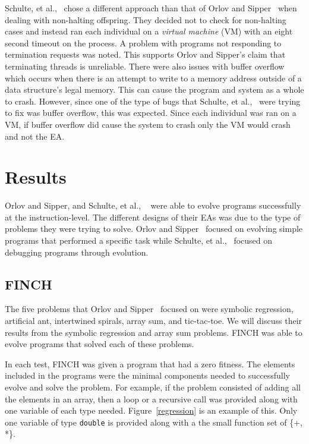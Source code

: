 \documentclass{sig-alternate}
\begin{document}
Schulte, et al.,~\cite{Assembly:2010} chose a different approach than that of Orlov and Sipper~\cite{FINCH:2011} when dealing with non-halting offspring. They decided not to check for non-halting cases and instead ran each individual on a \textit{virtual machine} (VM) with an eight second timeout on the process. A problem with programs not responding to termination requests was noted. This supports Orlov and Sipper's claim that terminating threads is unreliable. There were also issues with buffer overflow which occurs when there is an attempt to write to a memory address outside of a data structure's legal memory. This can cause the program and system as a whole to crash. However, since one of the type of bugs that Schulte, et al.,~\cite{Assembly:2010} were trying to fix was buffer overflow, this was expected. Since each individual was ran on a VM, if buffer overflow did cause the system to crash only the VM would crash and not the EA.




\section{Results}
Orlov and Sipper, and Schulte, et al., ~\cite{FINCH:2011, Assembly:2010} were able to evolve programs successfully at the instruction-level. The different designs of their EAs was due to the type of problems they were trying to solve. Orlov and Sipper~\cite{FINCH:2011} focused on evolving simple programs that performed a specific task while Schulte, et al.,~\cite{Assembly:2010} focused on debugging programs through evolution.

\subsection{FINCH}
The five problems that Orlov and Sipper~\cite{Assembly:2010} focused on were symbolic regression, artificial ant, intertwined spirals, array sum, and tic-tac-toe. We will discuss their results from the symbolic regression and array sum problems. FINCH was able to evolve programs that solved each of these problems.

In each test, FINCH was given a program that had a zero fitness. The elements included in the programs were the minimal components needed to successfully evolve and solve the problem. For example, if the problem consisted of adding all the elements in an array, then a loop or a recursive call was provided along with one variable of each type needed. Figure~\ref{regression} is an example of this. Only one variable of type \texttt{double} is provided along with a the small function set of \{+, *\}.
\end{document}
